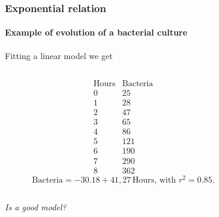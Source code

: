 \begin{frame}
\frametitle{Exponential relation}
\framesubtitle{Example of evolution of a bacterial culture}
Fitting a linear model we get
\begin{columns}
\begin{column}{0.3\textwidth}
\[
\begin{array}{c|c}
\mbox{Hours} & \mbox{Bacteria}\\
\hline
0 &  25 \\
1 & 28 \\
2 &  47\\
3 & 65 \\
4 & 86\\
5 & 121\\
6 & 190\\
7 & 290\\
8 & 362
\end{array}
\]
\[
\mbox{Bacteria} = -30.18+41,27\,\mbox{Hours, with } r^2=0.85. 
\]
\end{column}
\begin{column}{0.6\textwidth}
\begin{center}
\end{center}
\end{column}
\end{columns}
\begin{center}
\emph{Is a good model?}
\end{center}
\end{frame}



